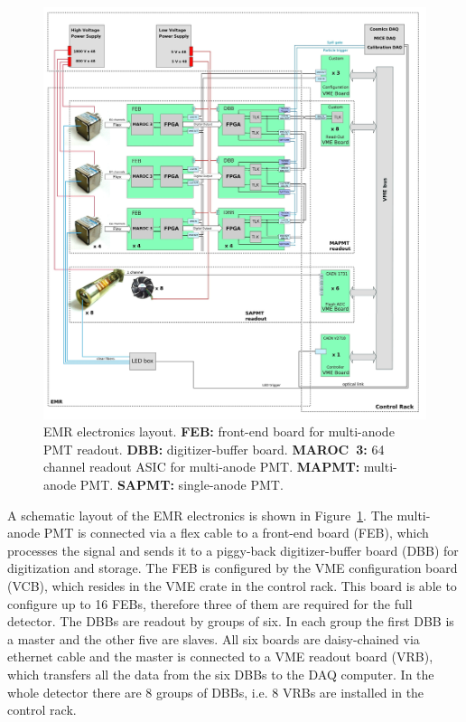 \documentclass[a4paper,11pt]{article}
\begin{document}
\begin{figure}[htp!]
 \centering
 \includegraphics[width=\textwidth]{./EMR_electronics_layout}
 \caption[EMR electronics layout.]{EMR electronics layout. {\bf FEB:} front-end board for multi-anode PMT readout. {\bf DBB:} digitizer-buffer
 board. {\bf MAROC~3:} 64 channel readout ASIC for multi-anode PMT. {\bf MAPMT:} multi-anode PMT. {\bf SAPMT:} single-anode PMT.}
 \label{fig:EMR_electronics_layout}
\end{figure}

A schematic layout of the EMR electronics is shown in Figure~\ref{fig:EMR_electronics_layout}. The multi-anode PMT is connected via a flex cable
to a front-end board (FEB), which processes the signal and sends it to a piggy-back digitizer-buffer board (DBB) for digitization and storage.
The FEB is configured by the VME configuration board (VCB), which resides in the VME crate in the control rack. This board is able to configure
up to 16 FEBs, therefore three of them are required for the full detector. The DBBs are readout by groups of six. In each group the first DBB
is a master and the other five are slaves. All six boards are daisy-chained via ethernet cable and the master is connected to a VME readout board
(VRB), which transfers all the data from the six DBBs to the DAQ computer. In the whole detector there are 8 groups of DBBs, i.e. 8 VRBs are
installed in the control rack. 
\end{document}
